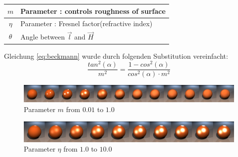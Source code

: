 \documentclass[11pt]{beamer}
\begin{document}
\begin{frame}[allowframebreaks]
\framebreak
\begin{table}[H]
\begin{tabular}{| c | l |}
\hline
$m$ & Parameter : controls roughness of surface\\ \hline
$\eta$  & Parameter : Fresnel factor(refractive index)\\ \hline
$\theta$  & Angle between $\vec{l}$ and $\vec{H}$\\ \hline
\end{tabular}
\end{table}
Gleichung \ref{eq:beckmann} wurde durch folgenden Substitution vereinfacht:
\begin{equation}
\frac{tan^2(\alpha)}{m^2} = \frac{1- cos^2(\alpha)}{cos^2(\alpha) \cdot m^2}
\end{equation}

\framebreak
\begin{figure}[H]
\includegraphics[width=\textwidth]{../ctroughcomplete.png}
\caption{Parameter $m$ from $0.01$ to $1.0$}
\end{figure}

\begin{figure}[H]
\includegraphics[width=\textwidth]{../ctfresnelcomplete.png}
\caption{Parameter $\eta$ from $1.0$ to $10.0$}
\end{figure}

\framebreak
\begin{center}
\end{center}

\end{frame}
\end{document}
